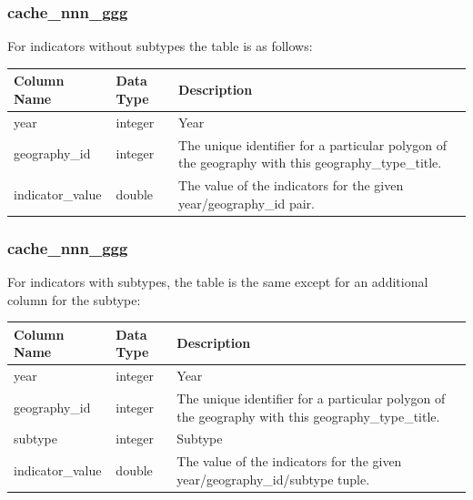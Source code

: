\subsubsection{cache_nnn_ggg}

For indicators without subtypes the table is as follows:

\begin{tabular}{llp{3.9in}}
\textbf{Column Name} & \textbf{Data Type} & \textbf{Description} \\
\hline
year & integer & Year  \\
\hline
geography_id & integer & The unique identifier for a particular polygon of the geography with this geography_type_title.  \\
\hline
indicator_value & double & The value of the indicators for the given year/geography_id pair.  \\
\hline

\end{tabular}

\subsubsection{cache_nnn_ggg}

For indicators with subtypes, the table is the same except for an additional
column for the subtype:

\begin{tabular}{llp{3.9in}}
\textbf{Column Name} & \textbf{Data Type} & \textbf{Description} \\
\hline
year & integer & Year  \\
\hline
geography_id & integer & The unique identifier for a particular polygon of the geography with this geography_type_title.  \\
\hline
subtype & integer & Subtype  \\
\hline
indicator_value & double & The value of the indicators for the given year/geography_id/subtype tuple.  \\
\hline

\end{tabular}


